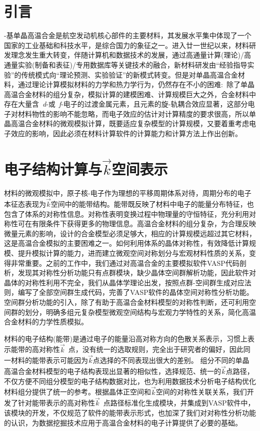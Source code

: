 \section{引言}
-基单晶高温合金是航空发动机核心部件的主要材料，其发展水平集中体现了一个国家的工业基础和科技水平，是综合国力的象征之一。进入廿一世纪以来，材料研发理念发生重大转变，伴随计算机和数据技术的发展，通过高通量计算(理论)/高通量实验(制备和表征)/专用数据库等关键技术的融合，新材料研发由“经验指导实验”的传统模式向“理论预测、实验验证”的新模式转变。但是对单晶高温合金材料，通过理论计算模拟材料的力学和热力学行为，仍然存在不小的困难:~除了单晶高温合金材料的组分复杂，模拟计算的建模困难、计算规模巨大之外，合金材料中存在大量含~\textit{d}-或~\textit{f}-电子的过渡金属元素，且元素的旋-轨耦合效应显著，这部分电子对材料物性的影响不能忽略，而电子效应的估计对计算精度的要求很高，所以单晶高温合金材料的微观模拟计算，既要适应复杂模型的计算规模，又要着重考虑电子效应的影响，因此必须在材料计算软件的计算能力和计算方法上作出创新。

\section{电子结构计算与$\vec k$空间表示}
材料的微观模拟中，原子核-电子作为理想的平移周期体系对待，周期分布的电子本征态表现为$\vec k$空间中的能带结构。能带既反映了材料中电子的能量分布特征，也包含了体系的对称性信息。对称性表明变换过程中物理量的守恒特征，充分利用对称性可在有限条件下获得更多的物理信息。高温合金材料的组分复杂，为合理反映微量元素的影响，设计的合金模型必须足够大，相应的计算规模远超过其它材料，这是高温合金模拟的主要困难之一。如何利用体系的晶体对称性，有效降低计算规模、提升模拟计算的能力，进而建立微观空间对称划分与宏观材料性质的关系，变得非常重要。之前的工作中，我们通过对高温合金的主要模拟软件\textrm{VASP}代码剖析，发现其对称性分析功能只有点群模块，缺少晶体空间群解析功能，因此软件对晶体的对称性利用不完全，我们从晶体学理论出发，按照点群-空间群生成对应法则，编写了全部空间群生成代码，完善了\textrm{VASP}软件的晶体空间对称性分析功能。空间群分析功能的引入，除了有助于高温合金材料模型的对称性判断，还可利用空间群的划分，明确多组元复杂模型微观空间结构与宏观力学特性的关系，简化高温合金材料的力学性质模拟。

材料的电子结构(能带)是通过电子的能量沿高对称方向的色散关系表示，习惯上表示能带的高对称性$\vec k$~点，没有统一的选取规则，完全出于研究者的偏好，因此同一材料的能带表示可能因为$\vec k$点选择的不同表现出很大的差别。%
组分不同的单晶高温合金材料模型的电子结构表现出显著的相似性，选择规范、统一的$\vec k$点路径，不仅方便不同组分模型的电子结构数据对比，也为利用数据技术分析电子结构优化材料组分提供了统一的参考。根据晶体正空间和$\vec k$空间的对称性关联关系，我们开发了针对能带表示的高对称性$\vec k$~点路径标准化生成模块，并集成到\textrm{VASP}软件中，该模块的开发，不仅规范了软件的能带表示形式，也加深了我们对对称性分析功能的认识，为数据挖掘技术应用于高温合金材料的电子计算提供了必要的基础。

